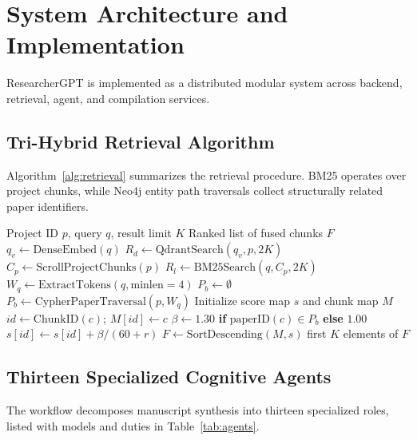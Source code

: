 \documentclass[conference]{IEEEtran}
\begin{document}
\section{System Architecture and Implementation}
ResearcherGPT is implemented as a distributed modular system across backend, retrieval, agent, and compilation services.

\subsection{Tri-Hybrid Retrieval Algorithm}
Algorithm~\ref{alg:retrieval} summarizes the retrieval procedure. BM25 operates over project chunks, while Neo4j entity path traversals collect structurally related paper identifiers.

\begin{algorithm}[!t]
\caption{Tri-Hybrid RRF Retrieval with Knowledge-Graph Boosting}
\label{alg:retrieval}
\begin{algorithmic}[1]
\Require Project ID $p$, query $q$, result limit $K$
\Ensure Ranked list of fused chunks $F$
\State $q_v \gets \mathrm{DenseEmbed}(q)$
\State $R_d \gets \mathrm{QdrantSearch}(q_v, p, 2K)$
\State $C_p \gets \mathrm{ScrollProjectChunks}(p)$
\State $R_l \gets \mathrm{BM25Search}(q, C_p, 2K)$
\State $W_q \gets \mathrm{ExtractTokens}(q, \mathrm{minlen}=4)$
\State $P_b \gets \emptyset$
  \State $P_b \gets \mathrm{CypherPaperTraversal}(p, W_q)$
\EndIf
\State Initialize score map $s$ and chunk map $M$
    \State $id \gets \mathrm{ChunkID}(c)$; $M[id] \gets c$
    \State $\beta \gets 1.30$ \textbf{if} $\mathrm{paperID}(c) \in P_b$ \textbf{else} $1.00$
    \State $s[id] \gets s[id] + \beta / (60 + r)$
  \EndFor
\EndFor
\State $F \gets \mathrm{SortDescending}(M, s)$
\State \Return first $K$ elements of $F$
\end{algorithmic}
\end{algorithm}

\subsection{Thirteen Specialized Cognitive Agents}
The workflow decomposes manuscript synthesis into thirteen specialized roles, listed with models and duties in Table~\ref{tab:agents}.
\end{document}
